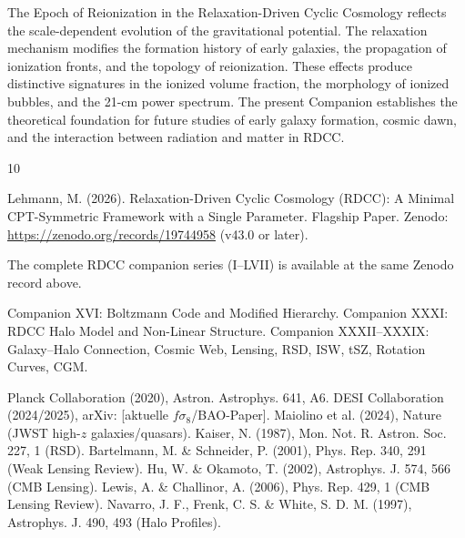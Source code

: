 \documentclass[11pt,a4paper]{article}
\begin{document}
The Epoch of Reionization in the Relaxation-Driven Cyclic Cosmology reflects the 
scale-dependent evolution of the gravitational potential. The relaxation mechanism 
modifies the formation history of early galaxies, the propagation of ionization 
fronts, and the topology of reionization. These effects produce distinctive 
signatures in the ionized volume fraction, the morphology of ionized bubbles, and 
the 21-cm power spectrum. The present Companion establishes the theoretical 
foundation for future studies of early galaxy formation, cosmic dawn, and the 
interaction between radiation and matter in RDCC.


\begin{thebibliography}{10}

 Lehmann, M. (2026). Relaxation-Driven Cyclic Cosmology (RDCC): A Minimal CPT-Symmetric Framework with a Single Parameter. Flagship Paper. Zenodo: \url{https://zenodo.org/records/19744958} (v43.0 or later).

 The complete RDCC companion series (I--LVII) is available at the same Zenodo record above.

 Companion XVI: Boltzmann Code and Modified Hierarchy.
 Companion XXXI: RDCC Halo Model and Non-Linear Structure.
 Companion XXXII--XXXIX: Galaxy--Halo Connection, Cosmic Web, Lensing, RSD, ISW, tSZ, Rotation Curves, CGM.

 Planck Collaboration (2020), Astron. Astrophys. 641, A6.
 DESI Collaboration (2024/2025), arXiv: [aktuelle $f\sigma_8$/BAO-Paper].
 Maiolino et al. (2024), Nature (JWST high-$z$ galaxies/quasars).
 Kaiser, N. (1987), Mon. Not. R. Astron. Soc. 227, 1 (RSD).
 Bartelmann, M. \& Schneider, P. (2001), Phys. Rep. 340, 291 (Weak Lensing Review).
 Hu, W. \& Okamoto, T. (2002), Astrophys. J. 574, 566 (CMB Lensing).
 Lewis, A. \& Challinor, A. (2006), Phys. Rep. 429, 1 (CMB Lensing Review).
 Navarro, J. F., Frenk, C. S. \& White, S. D. M. (1997), Astrophys. J. 490, 493 (Halo Profiles).

\end{thebibliography}
\end{document}
